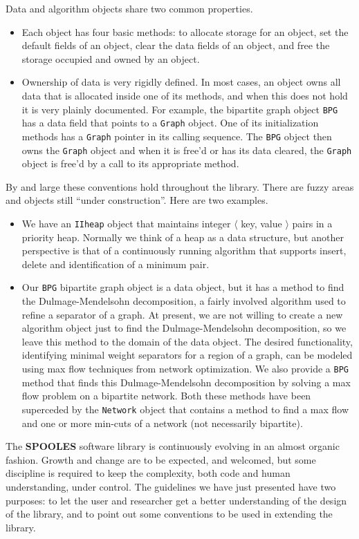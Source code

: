 Data and algorithm objects share two common properties.
\begin{itemize}
\item
Each object has four basic methods: to allocate storage for an
object, set the default fields of an object, 
clear the data fields of an object,
and free the storage occupied and owned by an object.
\item
Ownership of data is very rigidly defined.
In most cases,
an object owns all data that is allocated inside one of its
methods, 
and when this does not hold it is very plainly documented.
For example, the bipartite graph object {\tt BPG} has a data field
that points to a {\tt Graph} object.
One of its initialization methods has a {\tt Graph} pointer in its
calling sequence.
The {\tt BPG} object then owns the {\tt Graph} object and when it
is free'd or has its data cleared, the {\tt Graph} object is free'd
by a call to its appropriate method.
\end{itemize}
\par
By and large these conventions hold throughout the library.
There are fuzzy areas and objects still ``under construction''.
Here are two examples.
\begin{itemize}
\item
We have an {\tt IIheap} object that maintains integer 
$\langle$ key, value $\rangle$ pairs in a priority heap.
Normally we think of a heap as a data structure, but another 
perspective is that of a continuously running algorithm that
supports insert, delete and identification of a minimum pair.
\item
Our {\tt BPG} bipartite graph object is a data object, 
but it has a method to find the Dulmage-Mendelsohn decomposition, 
a fairly involved algorithm used to refine a separator of a graph.
At present, we are not willing to create a new algorithm object
just to find the Dulmage-Mendelsohn decomposition, so we leave
this method to the domain of the data object.
The desired functionality, identifying minimal
weight separators for a region of a graph, can be modeled using
max flow techniques from network optimization.
We also provide a {\tt BPG} method that finds this
Dulmage-Mendelsohn decomposition by solving a max flow problem on
a bipartite network.
Both these methods have been superceded by the {\tt Network} object
that contains a method to find a max flow and one or more min-cuts 
of a network (not necessarily bipartite).
\end{itemize}
\par
The {\bf SPOOLES} software library is continuously evolving in an
almost organic fashion.
Growth and change are to be expected, and welcomed, but some
discipline is required to keep the complexity, both code and human
understanding, under control.
The guidelines we have just presented have two purposes:
to let the user and researcher get a better understanding of
the design of the library, and to point out some conventions 
to be used in extending the library.
\par
